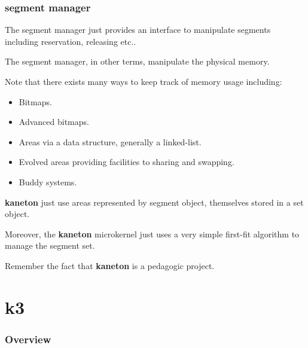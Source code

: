 
\begin{frame}
  \frametitle{segment manager}

  The segment manager just provides an interface to manipulate segments
  including reservation, releasing etc..

  \nl

  The segment manager, in other terms, manipulate the physical memory.

  \nl

  Note that there exists many ways to keep track of memory usage including:

  \begin{itemize}[<+->]
    \item
      Bitmaps.
    \item
      Advanced bitmaps.
    \item
      Areas via a data structure, generally a linked-list.
    \item
      Evolved areas providing facilities to sharing and swapping.
    \item
      Buddy systems.
  \end{itemize}

  \textbf{kaneton} just use areas represented by segment object, themselves
  stored in a set object.

  \nl

  Moreover, the \textbf{kaneton} microkernel just uses a very simple first-fit
  algorithm to manage the segment set.

  \nl

  Remember the fact that \textbf{kaneton} is a pedagogic project.
\end{frame}

%
%

\section{k3}


\begin{frame}
  \frametitle{Overview}

\end{frame}


